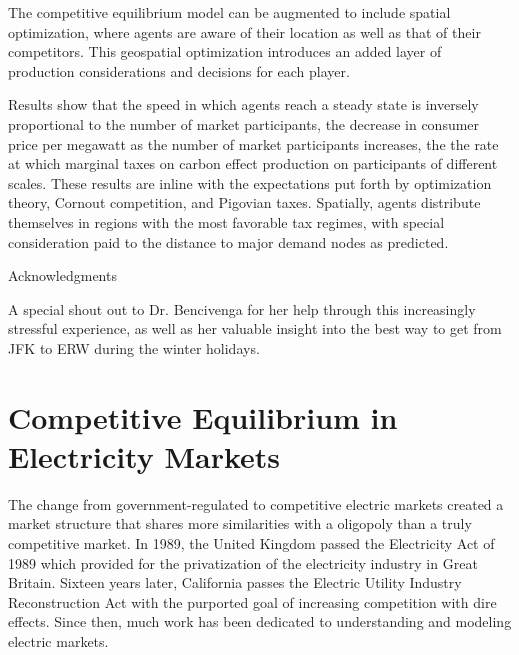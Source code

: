 \documentclass[12pt]{article}
\begin{document}
The competitive equilibrium model can be augmented to include spatial optimization, where agents are aware of their location as well as that of their competitors. This geospatial optimization introduces an added layer of production considerations and decisions for each player. 

Results show that the speed in which agents reach a steady state is inversely proportional to the number of market participants, the decrease in consumer price per megawatt as the number of market participants increases, the the rate at which marginal taxes on carbon effect production on participants of different scales. These results are inline with the expectations put forth by optimization theory, Cornout competition, and Pigovian taxes. Spatially, agents distribute themselves in regions with the most favorable tax regimes, with special consideration paid to the distance to major demand nodes as predicted.\*
 
\newpage

\begin{center}Acknowledgments \end{center}
A special shout out to Dr. Bencivenga for her help through this increasingly stressful experience, as well as her valuable insight into the best way to get from JFK to ERW during the winter holidays.
\newpage
\tableofcontents
 
\newpage 

\listoffigures

\newpage

\doublespacing
{}
\section{Competitive Equilibrium in Electricity Markets}
The change from government-regulated to competitive electric markets  created a market structure that shares more similarities with a oligopoly than a truly competitive market. In 1989, the United Kingdom passed the Electricity Act of 1989 which provided for the privatization of the electricity industry in Great Britain. Sixteen years later, California passes the Electric Utility Industry Reconstruction Act with the purported goal of increasing competition with dire effects. Since then, much work has been dedicated to understanding and modeling electric markets. \*
\end{document}
